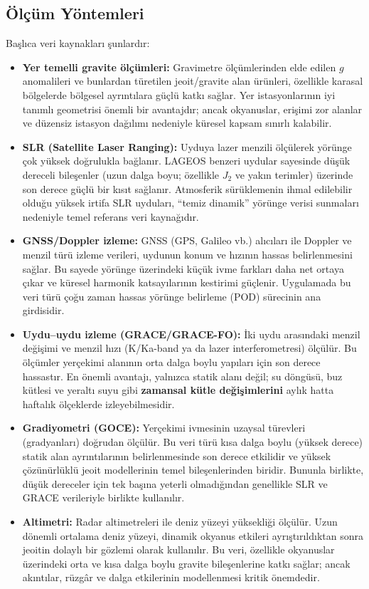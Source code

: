 \subsection{Ölçüm Yöntemleri}
Başlıca veri kaynakları şunlardır:

\begin{itemize}
\item \textbf{Yer temelli gravite ölçümleri:}
Gravimetre ölçümlerinden elde edilen $g$ anomalileri ve bunlardan türetilen jeoit/gravite alan ürünleri, özellikle karasal bölgelerde bölgesel ayrıntılara güçlü katkı sağlar. Yer istasyonlarının iyi tanımlı geometrisi önemli bir avantajdır; ancak okyanuslar, erişimi zor alanlar ve düzensiz istasyon dağılımı nedeniyle küresel kapsam sınırlı kalabilir.

\item \textbf{SLR (Satellite Laser Ranging):}
Uyduya lazer menzili ölçülerek yörünge çok yüksek doğrulukla bağlanır. LAGEOS benzeri uydular sayesinde düşük dereceli bileşenler (uzun dalga boyu; özellikle $J_2$ ve yakın terimler) üzerinde son derece güçlü bir kısıt sağlanır. Atmosferik sürüklemenin ihmal edilebilir olduğu yüksek irtifa SLR uyduları,
``temiz dinamik'' yörünge verisi sunmaları nedeniyle temel referans veri kaynağıdır.

\item \textbf{GNSS/Doppler izleme:}
GNSS (GPS, Galileo vb.) alıcıları ile Doppler ve menzil türü izleme verileri, uydunun konum ve hızının hassas belirlenmesini sağlar. Bu sayede yörünge üzerindeki küçük ivme farkları daha net ortaya çıkar ve küresel harmonik katsayılarının kestirimi güçlenir. Uygulamada bu veri türü çoğu zaman hassas yörünge belirleme (POD) sürecinin ana girdisidir.

\item \textbf{Uydu--uydu izleme (GRACE/GRACE-FO):}
İki uydu arasındaki menzil değişimi ve menzil hızı (K/Ka-band ya da lazer interferometresi) ölçülür. Bu ölçümler yerçekimi alanının orta dalga boylu yapıları için son derece hassastır.
En önemli avantajı, yalnızca statik alanı değil; su döngüsü, buz kütlesi ve yeraltı suyu gibi \textbf{zamansal kütle değişimlerini} aylık hatta haftalık ölçeklerde izleyebilmesidir.

\item \textbf{Gradiyometri (GOCE):}
Yerçekimi ivmesinin uzaysal türevleri (gradyanları) doğrudan ölçülür. Bu veri türü kısa dalga boylu (yüksek derece) statik alan ayrıntılarının belirlenmesinde son derece etkilidir ve yüksek çözünürlüklü jeoit modellerinin temel bileşenlerinden biridir. Bununla birlikte, düşük dereceler için tek başına yeterli olmadığından genellikle SLR ve GRACE verileriyle birlikte kullanılır.

\item \textbf{Altimetri:}
Radar altimetreleri ile deniz yüzeyi yüksekliği ölçülür.
Uzun dönemli ortalama deniz yüzeyi, dinamik okyanus etkileri ayrıştırıldıktan sonra
jeoitin dolaylı bir gözlemi olarak kullanılır.
Bu veri, özellikle okyanuslar üzerindeki orta ve kısa dalga boylu gravite bileşenlerine
katkı sağlar; ancak akıntılar, rüzgâr ve dalga etkilerinin modellenmesi kritik önemdedir.
\end{itemize}

